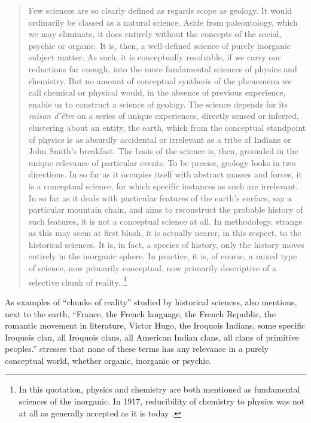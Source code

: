 \documentclass[output=paper]{langscibook}
\begin{document}
\begin{quotation}
    Few sciences are so clearly defined as regards scope as geology. It would ordinarily be classed as a natural science. Aside from paleontology, which we may eliminate, it does entirely without the concepts of the social, psychic or organic. It is, then, a well-defined science of purely inorganic subject matter. As such, it is conceptually resolvable, if we carry our reductions far enough, into the more fundamental sciences of physics and chemistry. But no amount of conceptual synthesis of the phenomena we call chemical or physical would, in the absence of previous experience, enable us to construct a science of geology. The science depends for its \emph{raison d'être} on a series of unique experiences, directly sensed or inferred, clustering about an entity, the earth, which from the conceptual standpoint of physics is as absurdly accidental or irrelevant as a tribe of Indians or John Smith's breakfast. The basis of the science is, then, grounded in the unique relevance of particular events. To be precise, geology looks in two directions. In so far as it occupies itself with abstract masses and forces, it is a conceptual science, for which specific instances as such are irrelevant. In so far as it deals with particular features of the earth's surface, say a particular mountain chain, and aims to reconstruct the probable history of such features, it is not a conceptual science at all. In methodology, strange as this may seem at first blush, it is actually nearer, in this respect, to the historical sciences. It is, in fact, a species of history, only the history moves entirely in the inorganic sphere. In practice, it is, of course, a mixed type of science, now primarily conceptual, now primarily descriptive of a selective chunk of reality.\label{q:elffers:sapirquote}
    \citep[445]{Sapir1917}\footnote{In this quotation, physics and chemistry are both mentioned as fundamental sciences of the inorganic. In 1917, reducibility of chemistry to physics was not at all as generally accepted as it is today \citep[cf.][13, 17--18]{Hettema2012}.} 
\end{quotation}

As examples of ``chunks of reality'' studied by historical sciences, {\Sapir} also mentions, next to the earth, ``France, the French language, the French Republic, the romantic movement in literature, Victor Hugo, the Iroquois Indians, some specific Iroquois clan, all Iroquois clans, all American Indian clans, all clans of primitive peoples.'' \citet[446]{Sapir1917} stresses that none of these terms has any relevance in a purely conceptual world, whether organic, inorganic or psychic.
\end{document}
